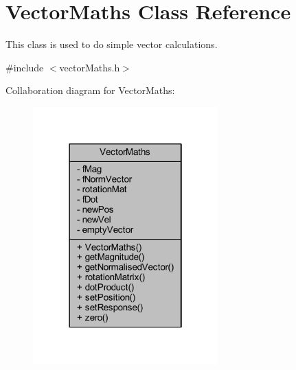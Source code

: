 \hypertarget{class_vector_maths}{}\section{Vector\+Maths Class Reference}
\label{class_vector_maths}


This class is used to do simple vector calculations.  




{\ttfamily \#include $<$vector\+Maths.\+h$>$}



Collaboration diagram for Vector\+Maths\+:\nopagebreak
\begin{figure}[H]
\begin{center}
\leavevmode
\includegraphics[width=202pt]{class_vector_maths__coll__graph}
\end{center}
\end{figure}
